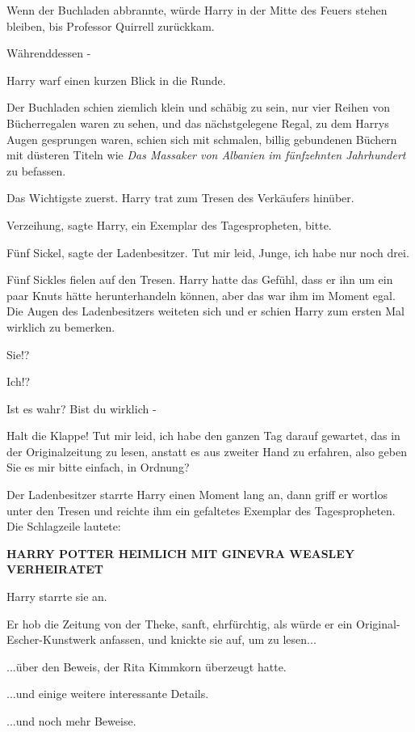 Wenn der Buchladen abbrannte, würde Harry in der Mitte des Feuers stehen
bleiben, bis Professor Quirrell zurückkam.

Währenddessen -

Harry warf einen kurzen Blick in die Runde.

Der Buchladen schien ziemlich klein und schäbig zu sein, nur vier Reihen von
Bücherregalen waren zu sehen, und das nächstgelegene Regal, zu dem Harrys Augen
gesprungen waren, schien sich mit schmalen, billig gebundenen Büchern mit
düsteren Titeln wie \emph{Das Massaker von Albanien im fünfzehnten Jahrhundert}
zu befassen.

Das Wichtigste zuerst. Harry trat zum Tresen des Verkäufers hinüber.

\glqq{}Verzeihung\grqq{}, sagte Harry, \glqq{}ein Exemplar des Tagespropheten,
bitte.\grqq{}

\glqq{}Fünf Sickel\grqq{}, sagte der Ladenbesitzer. \glqq{}Tut mir leid, Junge,
ich habe nur noch drei.\grqq{}

Fünf Sickles fielen auf den Tresen. Harry hatte das Gefühl, dass er ihn um ein
paar Knuts hätte herunterhandeln können, aber das war ihm im Moment egal. Die
Augen des Ladenbesitzers weiteten sich und er schien Harry zum ersten Mal
wirklich zu bemerken.

\glqq{}Sie!?\grqq{}

\glqq{}Ich!?\grqq{}

\glqq{}Ist es wahr? Bist du wirklich -\grqq{}

\glqq{}Halt die Klappe! Tut mir leid, ich habe den ganzen Tag darauf gewartet,
das in der Originalzeitung zu lesen, anstatt es aus zweiter Hand zu erfahren,
also geben Sie es mir bitte einfach, in Ordnung?\grqq{}

Der Ladenbesitzer starrte Harry einen Moment lang an, dann griff er wortlos
unter den Tresen und reichte ihm ein gefaltetes Exemplar des Tagespropheten. Die
Schlagzeile lautete:

\textbf{HARRY POTTER HEIMLICH MIT GINEVRA WEASLEY VERHEIRATET}

Harry starrte sie an.

Er hob die Zeitung von der Theke, sanft, ehrfürchtig, als würde er ein
Original-Escher-Kunstwerk anfassen, und knickte sie auf, um zu lesen...

...über den Beweis, der Rita Kimmkorn überzeugt hatte.

...und einige weitere interessante Details.

...und noch mehr Beweise.


